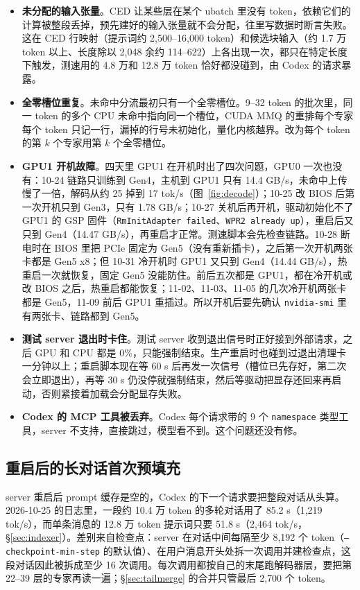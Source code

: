 \documentclass[11pt,a4paper]{article}
\newcommand{\code}[1]{\texttt{#1}}
\newcommand{\tps}{tok/s}
\begin{document}
\begin{itemize}
  \item \textbf{未分配的输入张量}。CED 让某些层在某个 ubatch 里没有 token，依赖它们的计算被整段丢掉，预先建好的输入张量就不会分配，往里写数据时断言失败。这在 CED 行映射（提示词约 2,500--16,000 token）和候选块输入（约 1.7 万 token 以上、长度除以 2,048 余约 114--622）上各出现一次，都只在特定长度下触发，测速用的 4.8 万和 12.8 万 token 恰好都没碰到，由 Codex 的请求暴露。
  \item \textbf{全零槽位重复}。未命中分流最初只有一个全零槽位。9--32 token 的批次里，同一 token 的多个 CPU 未命中指向同一个槽位，CUDA MMQ 的重排每个专家每个 token 只记一行，漏掉的行号未初始化，量化内核越界。改为每个 token 的第 $k$ 个专家用第 $k$ 个全零槽位。
  \item \textbf{GPU1 开机故障}。四天里 GPU1 在开机时出了四次问题，GPU0 一次也没有：10-24 链路只训练到 Gen4，主机到 GPU1 只有 14.4 GB/s，未命中上传慢了一倍，解码从约 25 掉到 17 \tps{}（图~\ref{fig:decode}）；10-25 改 BIOS 后第一次开机只到 Gen3，只有 1.78 GB/s；10-27 关机后再开机，驱动初始化不了 GPU1 的 GSP 固件（\code{RmInitAdapter failed}、\code{WPR2 already up}），重启后又只到 Gen4（14.47 GB/s），再重启才正常。测速脚本会先检查链路。10-28 断电时在 BIOS 里把 PCIe 固定为 Gen5（没有重新插卡），之后第一次开机两张卡都是 Gen5 x8；但 10-31 冷开机时 GPU1 又只到 Gen4（14.44 GB/s），热重启一次就恢复，固定 Gen5 没能防住。前后五次都是 GPU1，都在冷开机或改 BIOS 之后，热重启都能恢复；11-02、11-03、11-05 的几次冷开机两张卡都是 Gen5，11-09 前后 GPU1 重插过。所以开机后要先确认 \code{nvidia-smi} 里有两张卡、链路都到 Gen5。
  \item \textbf{测试 server 退出时卡住}。测试 server 收到退出信号时正好接到外部请求，之后 GPU 和 CPU 都是 0\%，只能强制结束。生产重启时也碰到过退出清理卡一分钟以上；重启脚本现在等 60 s 后再发一次信号（槽位已先存好，第二次会立即退出），再等 30 s 仍没停就强制结束，然后等驱动把显存还回来再启动，否则紧接着加载会分配显存失败。
  \item \textbf{Codex 的 MCP 工具被丢弃}。Codex 每个请求带的 9 个 \code{namespace} 类型工具，server 不支持，直接跳过，模型看不到。这个问题还没有修。
\end{itemize}

\subsection{重启后的长对话首次预填充}
\label{sec:restart}

server 重启后 prompt 缓存是空的，Codex 的下一个请求要把整段对话从头算。2026-10-25 的日志里，一段约 10.4 万 token 的多轮对话用了 85.2 s（1,219 \tps{}），而单条消息的 12.8 万 token 提示词只要 51.8 s（2,464 \tps{}，\S\ref{sec:indexer}）。差别来自检查点：server 在对话中间每隔至少 8,192 个 token（\code{--checkpoint-min-step} 的默认值）、在用户消息开头处拆一次调用并建检查点，这段对话因此被拆成至少 16 次调用。每次调用都按自己的末尾跑解码器层，要把第 22--39 层的专家再读一遍；\S\ref{sec:tailmerge} 的合并只管最后 2,700 个 token。
\end{document}
